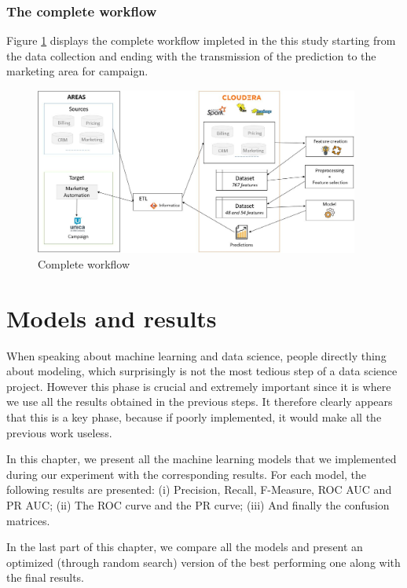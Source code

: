 \documentclass[LaM,binding=0.6cm, english]{sapthesis}
\begin{document}
\subsection{The complete workflow}

Figure \ref{fig:complete_wf} displays the complete workflow impleted in the this study starting from the data collection and ending with the transmission of the prediction to the marketing area for campaign.

\begin{figure}[!ht]
  \includegraphics[width=0.95\textwidth]{images/complete_wf.jpg}
  \centering
  \caption{Complete workflow}
  \label{fig:complete_wf}
\end{figure}

\chapter{Models and results}

When speaking about machine learning and data science, people directly thing about modeling, which surprisingly is not the most tedious step of a data science project. However this phase is crucial and extremely important since it is where we use all the results obtained in the previous steps. It therefore clearly appears that this is a key phase, because if poorly implemented, it would make all the previous work useless.

In this chapter, we present all the machine learning models that we implemented during our experiment with the corresponding results. For each model, the following results are presented: (i) Precision, Recall, F-Measure, ROC AUC and PR AUC; (ii) The ROC curve and the PR curve; (iii) And finally the confusion matrices.

In the last part of this chapter, we compare all the models and present an optimized (through random search) version of the best performing one along with the final results.
  
\end{document}
